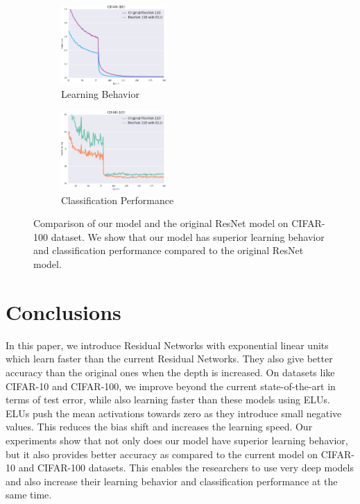 \documentclass[10pt,twocolumn,letterpaper]{article}
\begin{document}
\begin{figure}
    \centering
    \begin{subfigure}{.23\textwidth}
        \centering
        \includegraphics[width=4cm]{TrainLossCifar100}
        \caption{Learning Behavior}
        \label{fig:Cifar100TrainLoss}
    \end{subfigure}
    \begin{subfigure}{.23\textwidth}
        \centering
        \includegraphics[width=4cm]{TestErrorCifar100}
        \caption{Classification Performance}
        \label{fig:Cifar100TestError}
    \end{subfigure}
    \caption{Comparison of our model and the original ResNet model on CIFAR-100 dataset. We show that our model has superior learning behavior and classification performance compared to the original ResNet model.}
    \label{fig:Cifar100}
\end{figure}
\section{Conclusions}

In this paper, we introduce Residual Networks with exponential linear units which learn faster than the current Residual Networks. They also give better accuracy than the original ones when the depth is increased. On datasets like CIFAR-10 and CIFAR-100, we improve beyond the current state-of-the-art in terms of test error, while also learning faster than these models using ELUs. ELUs push the mean activations towards zero as they introduce small negative values. This reduces the bias shift and increases the learning speed. Our experiments show that not only does our model have superior learning behavior, but it also provides better accuracy as compared to the current model on CIFAR-10 and CIFAR-100 datasets. This enables the researchers to use very deep models and also increase their learning behavior and classification performance at the same time.
\end{document}
